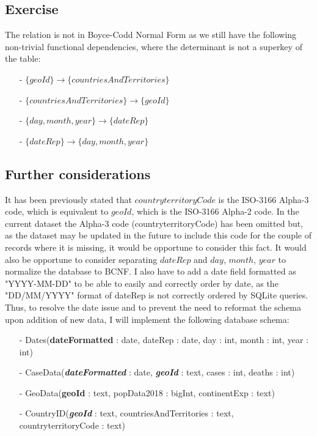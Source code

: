 \documentclass{article}
\newcounter{ex}
\newcommand{\exercise}{
\stepcounter{ex}
\subsection{Exercise \arabic{ex}}
}
\begin{document}
\exercise
The relation is not in Boyce-Codd Normal Form as we still have the following non-trivial functional dependencies, where the determinant is not a superkey of the table:
\begin{itemize}
    \item[-] $\{geoId\} \rightarrow \{countriesAndTerritories\}$
    \item[-] $\{countriesAndTerritories\} \rightarrow \{geoId\}$
    \item[-] $\{day, month, year\} \rightarrow \{dateRep\}$
    \item[-] $\{dateRep\} \rightarrow \{day, month, year\}$
\end{itemize}
\newpage
\subsection{Further considerations}

It has been previously stated that $countryterritoryCode$ is the ISO-3166 Alpha-3 code, which is equivalent to $geoId$, which is the ISO-3166 Alpha-2 code. In the current dataset the Alpha-3 code (countryterritoryCode) has been omitted but, as the dataset may be updated in the future to include this code for the couple of records where it is missing, it would be opportune to consider this fact. \newline
It would also be opportune to consider separating $dateRep$ and $day$, $month$, $year$ to normalize the database to BCNF. \newline
I also have to add a date field formatted as "YYYY-MM-DD" to be able to easily and correctly order by date, as the "DD/MM/YYYY" format of dateRep is not correctly ordered by SQLite queries. 
Thus, to resolve the date issue and to prevent the need to reformat the schema upon addition of new data, I will implement the following database schema:
\begin{itemize}
    \item[-] Dates(\textbf{dateFormatted} : date, dateRep : date, day : int, month : int, year : int)
    \item[-] CaseData(\textbf{\textit{dateFormatted}} : date, \textbf{\textit{geoId}} : text, cases : int, deaths : int)
    \item[-] GeoData(\textbf{geoId} : text, popData2018 : bigInt, continentExp : text)
    \item[-] CountryID(\textbf{\textit{geoId}} : text, countriesAndTerritories : text, countryterritoryCode : text)
\end{itemize}
\end{document}
